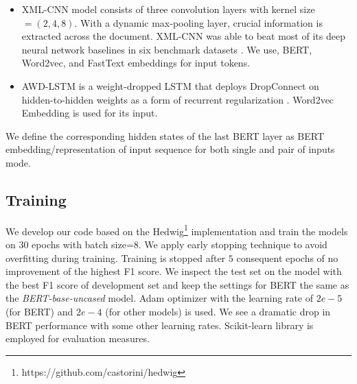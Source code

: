 \documentclass[11pt,a4paper]{article}
\begin{document}
\begin{itemize}
    
    \item XML-CNN model consists of three convolution layers with kernel size$=(2,4,8)$. With a  dynamic max-pooling layer, crucial information is extracted across the document. XML-CNN was able to beat most of its deep neural network baselines in six benchmark datasets \cite{liu2017deep}. We use, BERT, Word2vec, and FastText \cite{mikolov2018advances} embeddings for input tokens.
    \item AWD-LSTM  is a weight-dropped LSTM that deploys DropConnect on hidden-to-hidden weights as a form of recurrent regularization \cite{merity2017regularizing}.  Word2vec Embedding is used for its input. 

\end{itemize}

 We define the corresponding hidden states of the last BERT layer as BERT embedding/representation of input sequence for both single and pair of inputs mode.


\subsection{Training}
We develop our code based on the Hedwig\footnote{https://github.com/castorini/hedwig}  implementation and train the models on $30$ epochs with batch size=$8$. We apply early stopping technique to avoid overfitting during training.  Training is stopped after $5$ consequent epochs of no improvement of the highest F1 score.
 We inspect the test set on the model with the best F1 score of development set and keep the settings for BERT the same as the \textit{BERT-base-uncased} model. Adam optimizer with the learning rate of $2e-5$ (for BERT)  and $2e-4$ (for other models) is used. We see a dramatic drop in BERT performance with some other learning rates. Scikit-learn \cite{scikit-learn} library is employed for evaluation measures.
\end{document}
